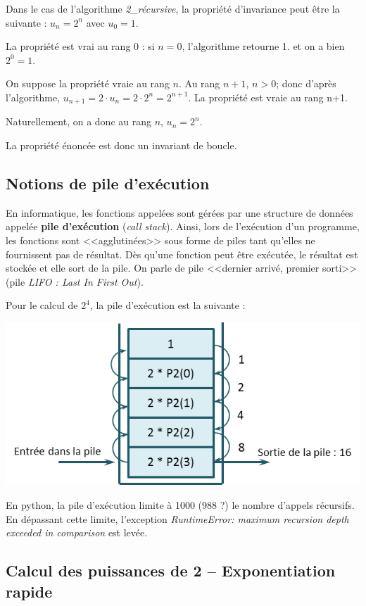 \documentclass[10pt,fleqn]{article} %
\begin{document}
\begin{exemple}
Dans le cas de l'algorithme \textsl{2\_récursive}, la propriété d'invariance peut être la suivante : $u_n = 2^n$ avec $u_0 = 1$. 

La propriété est vrai au rang 0 : si $n=0$, l'algorithme retourne 1. et on a bien $2^0=1$.

On suppose la propriété vraie au rang $n$. Au rang $n+1$, $n>0$; donc d'après l'algorithme, $u_{n+1}=2\cdot u_n =2\cdot 2^n = 2^{n+1}$. La propriété est vraie au rang n+1.

Naturellement, on a donc au rang $n$, $u_n = 2^n$. 

La propriété énoncée est donc un invariant de boucle.
\end{exemple}
\subsection{Notions de pile d'exécution}
En informatique, les fonctions appelées sont gérées par une structure de données appelée \textbf{pile d'exécution} (\textit{call stack}). Ainsi, lors de l'exécution d'un programme, les fonctions sont <<agglutinées>> sous forme de piles tant qu'elles ne fournissent pas de résultat.
Dès qu'une fonction peut être exécutée, le résultat est stockée et elle sort de la pile. On parle de pile <<dernier arrivé, premier sorti>> (pile \textit{LIFO : Last In First Out}).

\begin{exemple}
Pour le calcul de $2^4$, la pile d'exécution est la suivante : 
\begin{center}
\includegraphics[width=.5\linewidth]{images/pile}
\end{center} 
\end{exemple}

\begin{rem}
En python, la pile d'exécution limite à 1000 (988 ?) le nombre d'appels récursifs. En dépassant cette limite, l'exception \textsl{RuntimeError: maximum recursion depth exceeded in comparison
} est levée.
\end{rem}

\subsection{Calcul des puissances de 2 -- Exponentiation rapide}
\end{document}
